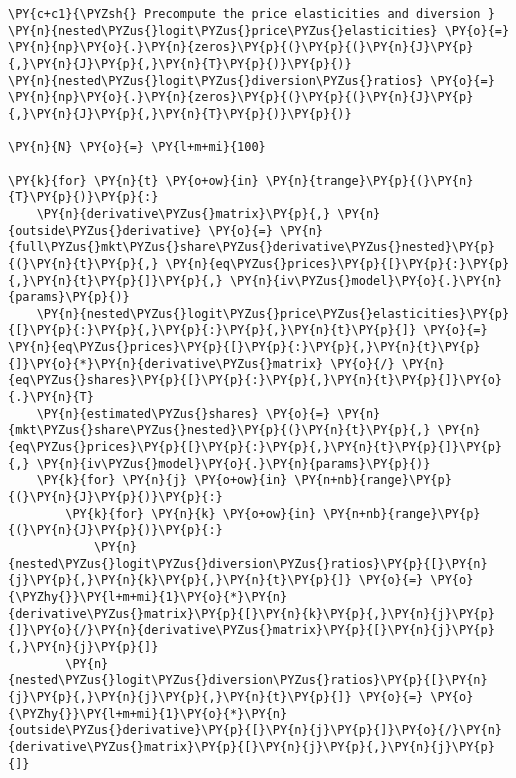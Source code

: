     \begin{tcolorbox}[breakable, size=fbox, boxrule=1pt, pad at break*=1mm,colback=cellbackground, colframe=cellborder]
\begin{Verbatim}[commandchars=\\\{\}]
\PY{c+c1}{\PYZsh{} Precompute the price elasticities and diversion }
\PY{n}{nested\PYZus{}logit\PYZus{}price\PYZus{}elasticities} \PY{o}{=} \PY{n}{np}\PY{o}{.}\PY{n}{zeros}\PY{p}{(}\PY{p}{(}\PY{n}{J}\PY{p}{,}\PY{n}{J}\PY{p}{,}\PY{n}{T}\PY{p}{)}\PY{p}{)}
\PY{n}{nested\PYZus{}logit\PYZus{}diversion\PYZus{}ratios} \PY{o}{=} \PY{n}{np}\PY{o}{.}\PY{n}{zeros}\PY{p}{(}\PY{p}{(}\PY{n}{J}\PY{p}{,}\PY{n}{J}\PY{p}{,}\PY{n}{T}\PY{p}{)}\PY{p}{)}

\PY{n}{N} \PY{o}{=} \PY{l+m+mi}{100}

\PY{k}{for} \PY{n}{t} \PY{o+ow}{in} \PY{n}{trange}\PY{p}{(}\PY{n}{T}\PY{p}{)}\PY{p}{:}
    \PY{n}{derivative\PYZus{}matrix}\PY{p}{,} \PY{n}{outside\PYZus{}derivative} \PY{o}{=} \PY{n}{full\PYZus{}mkt\PYZus{}share\PYZus{}derivative\PYZus{}nested}\PY{p}{(}\PY{n}{t}\PY{p}{,} \PY{n}{eq\PYZus{}prices}\PY{p}{[}\PY{p}{:}\PY{p}{,}\PY{n}{t}\PY{p}{]}\PY{p}{,} \PY{n}{iv\PYZus{}model}\PY{o}{.}\PY{n}{params}\PY{p}{)}
    \PY{n}{nested\PYZus{}logit\PYZus{}price\PYZus{}elasticities}\PY{p}{[}\PY{p}{:}\PY{p}{,}\PY{p}{:}\PY{p}{,}\PY{n}{t}\PY{p}{]} \PY{o}{=} \PY{n}{eq\PYZus{}prices}\PY{p}{[}\PY{p}{:}\PY{p}{,}\PY{n}{t}\PY{p}{]}\PY{o}{*}\PY{n}{derivative\PYZus{}matrix} \PY{o}{/} \PY{n}{eq\PYZus{}shares}\PY{p}{[}\PY{p}{:}\PY{p}{,}\PY{n}{t}\PY{p}{]}\PY{o}{.}\PY{n}{T}
    \PY{n}{estimated\PYZus{}shares} \PY{o}{=} \PY{n}{mkt\PYZus{}share\PYZus{}nested}\PY{p}{(}\PY{n}{t}\PY{p}{,} \PY{n}{eq\PYZus{}prices}\PY{p}{[}\PY{p}{:}\PY{p}{,}\PY{n}{t}\PY{p}{]}\PY{p}{,} \PY{n}{iv\PYZus{}model}\PY{o}{.}\PY{n}{params}\PY{p}{)}
    \PY{k}{for} \PY{n}{j} \PY{o+ow}{in} \PY{n+nb}{range}\PY{p}{(}\PY{n}{J}\PY{p}{)}\PY{p}{:}
        \PY{k}{for} \PY{n}{k} \PY{o+ow}{in} \PY{n+nb}{range}\PY{p}{(}\PY{n}{J}\PY{p}{)}\PY{p}{:}
            \PY{n}{nested\PYZus{}logit\PYZus{}diversion\PYZus{}ratios}\PY{p}{[}\PY{n}{j}\PY{p}{,}\PY{n}{k}\PY{p}{,}\PY{n}{t}\PY{p}{]} \PY{o}{=} \PY{o}{\PYZhy{}}\PY{l+m+mi}{1}\PY{o}{*}\PY{n}{derivative\PYZus{}matrix}\PY{p}{[}\PY{n}{k}\PY{p}{,}\PY{n}{j}\PY{p}{]}\PY{o}{/}\PY{n}{derivative\PYZus{}matrix}\PY{p}{[}\PY{n}{j}\PY{p}{,}\PY{n}{j}\PY{p}{]}
        \PY{n}{nested\PYZus{}logit\PYZus{}diversion\PYZus{}ratios}\PY{p}{[}\PY{n}{j}\PY{p}{,}\PY{n}{j}\PY{p}{,}\PY{n}{t}\PY{p}{]} \PY{o}{=} \PY{o}{\PYZhy{}}\PY{l+m+mi}{1}\PY{o}{*}\PY{n}{outside\PYZus{}derivative}\PY{p}{[}\PY{n}{j}\PY{p}{]}\PY{o}{/}\PY{n}{derivative\PYZus{}matrix}\PY{p}{[}\PY{n}{j}\PY{p}{,}\PY{n}{j}\PY{p}{]}
\end{Verbatim}
\end{tcolorbox}


